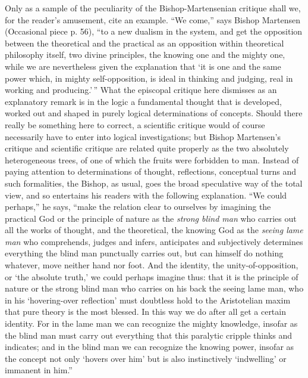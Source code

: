 \documentclass[12pt]{book}
\newcommand{\opage}[1]{\marginnote{\footnotesize\textit{[#1]}}}
\begin{document}
Only as a sample of the peculiarity of the Bishop-Martensenian critique shall we, for the reader's amusement, cite an example. ``We come,'' says Bishop Martensen (Occasional piece p. 56), ``to a new dualism in the system, and get the opposition between the theoretical and the practical as an opposition within theoretical philosophy itself, two divine principles, the knowing one and the mighty one, while we are nevertheless given the explanation that `it is one and the same power which, in mighty self-opposition, is ideal in thinking and judging, real in working and producing.'\,'' What the episcopal critique here dismisses as an explanatory remark is in the logic a fundamental thought that is developed, worked out and shaped in purely logical determinations of concepts. Should there really be something here to correct, a scientific critique would of course necessarily have to enter into logical investigations; but Bishop Martensen's critique and scientific critique are related quite properly as the two absolutely
\opage{132}\setcounter{footnote}{0}%
heterogeneous trees, of one of which the fruits were forbidden to man. Instead of paying attention to determinations of thought, reflections, conceptual turns and such formalities, the Bishop, as usual, goes the broad speculative way of the total view, and so entertains his readers with the following explanation. ``We could perhaps,'' he says, ``make the relation clear to ourselves by imagining the practical God or the principle of nature as the \emph{strong blind man} who carries out all the works of thought, and the theoretical, the knowing God as the \emph{seeing lame man} who comprehends, judges and infers, anticipates and subjectively determines everything the blind man punctually carries out, but can himself do nothing whatever, move neither hand nor foot. And the identity, the unity-of-opposition, or `the absolute truth,' we could perhaps imagine thus: that it is the principle of nature or the strong blind man who carries on his back the seeing lame man, who in his `hovering-over reflection' must doubtless hold to the Aristotelian maxim that pure theory is the most blessed. In this way we do after all get a certain identity. For in the lame man we can recognize the mighty knowledge, insofar as the blind man must carry out everything that this paralytic cripple thinks and indicates; and in the blind man we can recognize the knowing power, insofar as the concept not only `hovers over him' but is also instinctively `indwelling' or immanent in him.''
\end{document}
